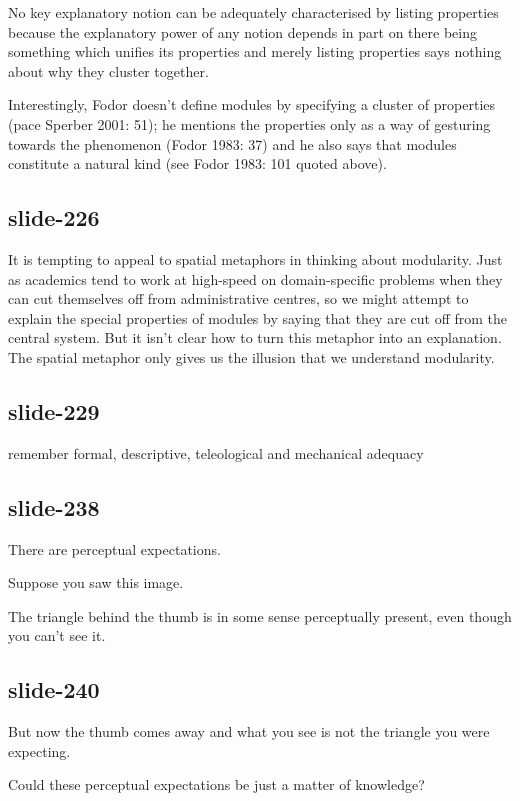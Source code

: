 \documentclass[12pt,\papersize]{extarticle}
\begin{document}
 
 
No key explanatory notion can be adequately characterised by listing properties because the explanatory power of any notion depends in part on there being something which unifies its properties and merely listing properties says nothing about why they cluster together.
 
 
 
Interestingly, Fodor doesn't define modules by specifying a cluster of properties (pace Sperber 2001: 51); he mentions the properties only as a way of gesturing towards the phenomenon (Fodor 1983: 37) and he also says that modules constitute a natural kind (see Fodor 1983: 101 quoted above).
 
\subsection{slide-226}
It is tempting to appeal to spatial metaphors in thinking about modularity.  Just as academics tend to work at high-speed on domain-specific problems when they can cut themselves off from administrative centres, so we might attempt to explain the special properties of modules by saying that they are cut off from the central system.  But it isn't clear how to turn this metaphor into an explanation.  The spatial metaphor only gives us the illusion that we understand modularity.
 
\subsection{slide-229}
remember formal, descriptive, teleological and mechanical adequacy
 
\subsection{slide-238}
There are perceptual expectations.
 
Suppose you saw this image.
 
The triangle behind the thumb is in some sense perceptually present, even though you can't see it.
 
\subsection{slide-240}
But now the thumb comes away and what you see is not the triangle you were expecting.
 
Could these perceptual expectations be just a matter of knowledge?
 
\end{document}
